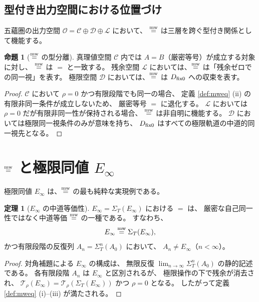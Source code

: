 \documentclass[11pt,a4paper]{article}
\theoremstyle{definition}
\newtheorem{theorem}{定理}[section]
\newtheorem{proposition}{命題}[section]
\newcommand{\C}{\mathcal{C}}
\newcommand{\Lspace}{\mathcal{L}}
\newcommand{\Dspace}{\mathcal{D}}
\newcommand{\Ospace}{\mathcal{O}}
\newcommand{\SelfRef}{\Sigma}
\newcommand{\Einfty}{E_{\infty}}
\begin{document}
\subsection{型付き出力空間における位置づけ}

五蘊圏の出力空間 $\Ospace=\C\oplus\Dspace\oplus\Lspace$ において、
$\mathrel{\overset{\mathrm{mw}}{=}}$ は三層を跨ぐ型付き関係として機能する。

\begin{proposition}[$\mathrel{\overset{\mathrm{mw}}{=}}$ の型分離]\label{prop:typed}
真理値空間 $\C$ 内では $A=B$（厳密等号）が成立する対象に対し、
$\mathrel{\overset{\mathrm{mw}}{=}}$ は $=$ と一致する。
残余空間 $\Lspace$ においては、$\mathrel{\overset{\mathrm{mw}}{=}}$ は「残余ゼロでの同一視」を表す。
極限空間 $\Dspace$ においては、$\mathrel{\overset{\mathrm{mw}}{=}}$ は $D_{\mathrm{fix}0}$ への収束を表す。
\end{proposition}

\begin{proof}
$\C$ において $\rho=0$ かつ有限段階でも同一の場合、
定義 \ref{def:mweq} (ii) の有限非同一条件が成立しないため、
厳密等号 $=$ に退化する。
$\Lspace$ においては $\rho=0$ だが有限非同一性が保持される場合、
$\mathrel{\overset{\mathrm{mw}}{=}}$ は非自明に機能する。
$\Dspace$ においては極限同一視条件のみが意味を持ち、
$D_{\mathrm{fix}0}$ はすべての極限軌道の中道的同一視先となる。
\end{proof}

\section{\texorpdfstring{$\mathrel{\overset{\mathrm{mw}}{=}}$}{mw-equivalence} と極限同値 \texorpdfstring{$E_\infty$}{E-infinity}}

極限同値 $\Einfty$ は、$\mathrel{\overset{\mathrm{mw}}{=}}$ の最も純粋な実現例である。

\begin{theorem}[$\Einfty$ の中道等価性]\label{thm:einfty-mweq}
$\Einfty = \SelfRef_T(\Einfty)$ における $=$ は、
厳密な自己同一性ではなく中道等価 $\mathrel{\overset{\mathrm{mw}}{=}}$ の一種である。
すなわち、
\[
\Einfty \mweq \SelfRef_T(\Einfty),
\]
かつ有限段階の反復列 $A_n=\SelfRef_T^n(A_0)$ において、
$A_n\neq\Einfty$（$n<\infty$）。
\end{theorem}

\begin{proof}
対角補題による $\Einfty$ の構成は、
無限反復 $\lim_{n\to\infty}\SelfRef_T^n(A_0)$ の静的記述である。
各有限段階 $A_n$ は $\Einfty$ と区別されるが、
極限操作の下で残余が消去され、
$\mathcal{T}_\rho(\Einfty)=\mathcal{T}_\rho(\SelfRef_T(\Einfty))$
かつ $\rho=0$ となる。
したがって定義 \ref{def:mweq} (i)--(iii) が満たされる。
\end{proof}
\end{document}
